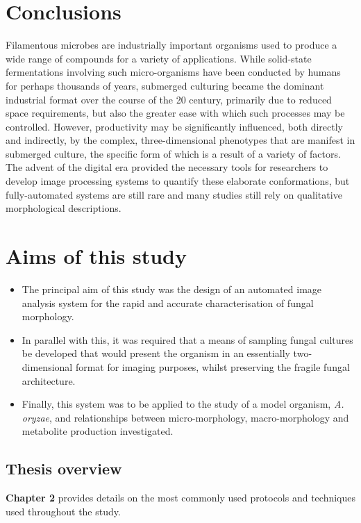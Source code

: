 \section{Conclusions}

Filamentous microbes are industrially important organisms used to produce a wide range of compounds for a variety of applications. While solid-state fermentations involving such micro-organisms have been conducted by humans for perhaps thousands of years, submerged culturing became the dominant industrial format over the course of the 20 century, primarily due to reduced space requirements, but also the greater ease with which such processes may be controlled. However, productivity may be significantly influenced, both directly and indirectly, by the complex, three-dimensional phenotypes that are manifest in submerged culture, the specific form of which is a result of a variety of factors. The advent of the digital era provided the necessary tools for researchers to develop image processing systems to quantify these elaborate conformations, but fully-automated systems are still rare and many studies still rely on qualitative morphological descriptions.

\section{Aims of this study}

\begin{itemize}
	\item The principal aim of this study was the design of an automated image analysis system for the rapid and accurate characterisation of fungal morphology.
	\item In parallel with this, it was required that a means of sampling fungal cultures be developed that would present the organism in an essentially two-dimensional format for imaging purposes, whilst preserving the fragile fungal architecture.
	\item Finally, this system was to be applied to the study of a model organism, \emph{A. oryzae}, and relationships between micro-morphology, macro-morphology and metabolite production investigated.
\end{itemize}

\subsection{Thesis overview}

\textbf{Chapter 2} provides details on the most commonly used protocols and techniques used throughout the study.

